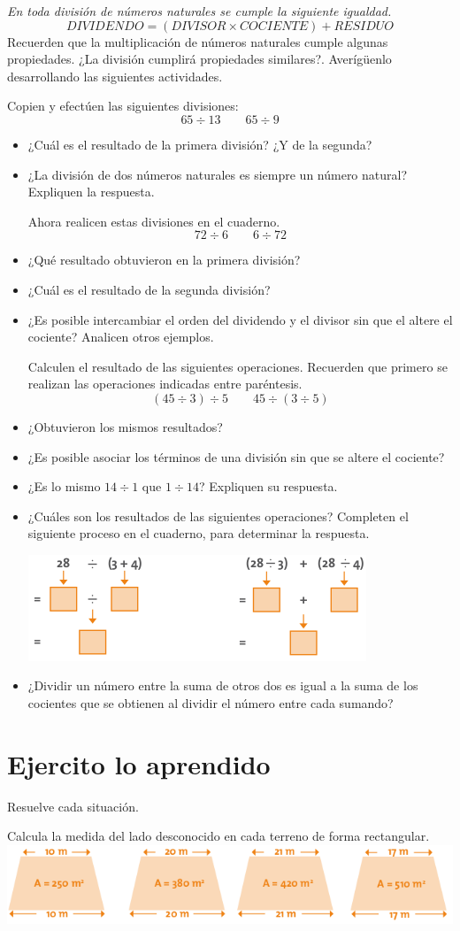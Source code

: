 \documentclass[letterpaper,11pt,twoside]{article}
\begin{document}
\begin{multicols}{2}
\emph{En toda división de números naturales se cumple
la siguiente igualdad.}
\[DIVIDENDO=(DIVISOR\times COCIENTE)+RESIDUO\]
Recuerden que la multiplicación de números naturales
cumple algunas propiedades. ¿La división cumplirá propiedades similares?. Averígüenlo desarrollando las siguientes actividades.

Copien y efectúen las siguientes divisiones:
\[65\div 13 \qquad 65\div 9\]
\begin{itemize}
\item ¿Cuál es el resultado de la primera división? ¿Y de la segunda?
\item ¿La división de dos números naturales es siempre un número natural? Expliquen la respuesta.

Ahora realicen estas divisiones en el cuaderno.
\[72\div 6 \qquad 6\div 72\]
\item ¿Qué resultado obtuvieron en la primera división?
\item ¿Cuál es el resultado de la segunda división?
\item ¿Es posible intercambiar el orden del dividendo y el divisor sin que el altere el cociente? Analicen otros ejemplos.

Calculen el resultado de las siguientes operaciones. Recuerden que primero se realizan las operaciones indicadas entre paréntesis.
\[(45\div 3)\div 5\qquad 45\div (3\div 5) \]
\item ¿Obtuvieron los mismos resultados?
\item ¿Es posible asociar los términos de una división sin que se altere el cociente?
\item ¿Es lo mismo $14 \div 1$ que $1 \div 14$? Expliquen su respuesta.
\item ¿Cuáles son los resultados de las siguientes
operaciones? Completen el siguiente proceso en el
cuaderno, para determinar la respuesta.
\begin{center}
\includegraphics[scale=.55]{Images/divisiones.png} 
\end{center}
\item ¿Dividir un número entre la suma de otros dos es igual a la suma de los cocientes que se obtienen al dividir el número entre cada sumando?
\end{itemize}
\section*{Ejercito lo aprendido}
Resuelve cada situación.

Calcula la medida del lado desconocido en cada terreno de forma rectangular.
\includegraphics[scale=.55]{Images/trapecios.png} 
\end{multicols}
\end{document}

